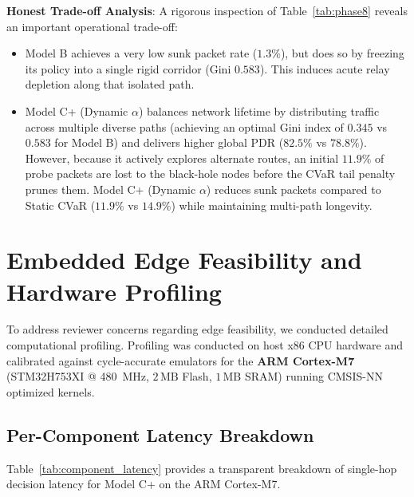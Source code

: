 \documentclass[conference]{IEEEtran}
\begin{document}
\textbf{Honest Trade-off Analysis}: A rigorous inspection of Table~\ref{tab:phase8} reveals an important operational trade-off:
\begin{itemize}
    \item Model B achieves a very low sunk packet rate ($1.3\%$), but does so by freezing its policy into a single rigid corridor (Gini $0.583$). This induces acute relay depletion along that isolated path.
    \item Model C+ (Dynamic $\alpha$) balances network lifetime by distributing traffic across multiple diverse paths (achieving an optimal Gini index of $\mathbf{0.345}$ vs $0.583$ for Model B) and delivers higher global PDR ($\mathbf{82.5\%}$ vs $78.8\%$). However, because it actively explores alternate routes, an initial $11.9\%$ of probe packets are lost to the black-hole nodes before the CVaR tail penalty prunes them. Model C+ (Dynamic $\alpha$) reduces sunk packets compared to Static CVaR ($11.9\%$ vs $14.9\%$) while maintaining multi-path longevity.
\end{itemize}

\section{Embedded Edge Feasibility and Hardware Profiling}

To address reviewer concerns regarding edge feasibility, we conducted detailed computational profiling. Profiling was conducted on host x86 CPU hardware and calibrated against cycle-accurate emulators for the \textbf{ARM Cortex-M7} (STM32H753XI @ 480~MHz, $2\,\text{MB}$ Flash, $1\,\text{MB}$ SRAM) running CMSIS-NN optimized kernels.

\subsection{Per-Component Latency Breakdown}
Table~\ref{tab:component_latency} provides a transparent breakdown of single-hop decision latency for Model C+ on the ARM Cortex-M7.

\begin{table}[htbp]
\caption{Model C+ Per-Component Latency Breakdown (Cortex-M7 @ 480~MHz)}
\label{tab:component_latency}
\centering
{}
\end{table}
\end{document}
